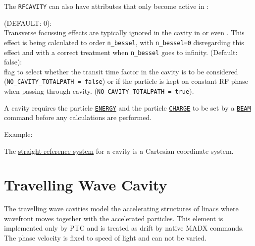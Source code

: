 The \texttt{RFCAVITY} can also have attributes that only become active in
\ptc:
\begin{madlist}
    (DEFAULT: 0): \\
     Transverse focussing effects are typically ignored in the cavity in
     \madx or even \ptc. This effect is being calculated to order
     \texttt{n\_bessel}, with \texttt{n\_bessel=0} disregarding this
     effect and with a correct treatment when \texttt{n\_bessel} goes to
     infinity.
    (Default: false): \\
     flag to select whether the transit time factor in the cavity is to be
     considered (\texttt{NO\_CAVITY\_TOTALPATH = false}) or if the particle is
     kept on constant RF phase when passing through cavity. (\texttt{NO\_CAVITY\_TOTALPATH = true}).
\end{madlist}

A cavity requires the particle \hyperref[sec:beam]{\texttt{ENERGY}}
and the particle \hyperref[sec:beam]{\texttt{CHARGE}} to be set by a
\hyperref[sec:beam]{\texttt{BEAM}} command before any calculations are
performed.

Example:

The \hyperref[subsec:local-straight]{straight reference system} for a
cavity is a Cartesian coordinate system.


\section{Travelling Wave Cavity}
\label{sec:tw-cavity}\label{sec:twcavity}


The travelling wave cavities model the accelerating structures of linacs
where wavefront moves together with the accelerated particles.
This element is implemented only by PTC and is treated as drift
by native MADX commands. The phase velocity is fixed to speed of light
and can not be varied.

